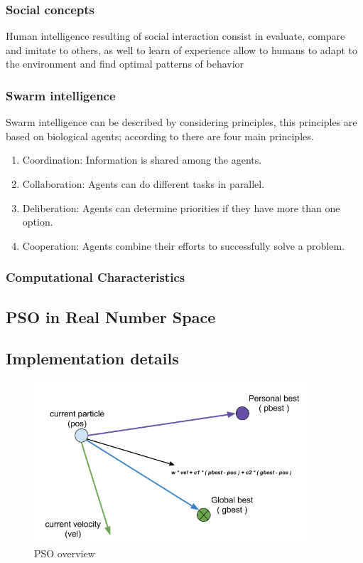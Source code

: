 \documentclass[journal]{IEEEtran}
\begin{document}
\subsubsection{ Social concepts }
Human intelligence resulting of social interaction consist in evaluate, compare and imitate to others, as well to learn of experience allow to humans to adapt to the environment and find optimal patterns of behavior

\subsubsection{ Swarm intelligence }
Swarm intelligence can be described by considering principles, this principles are based on biological agents; according to \cite{Garnier2007} there are four main principles.
\begin{enumerate}
    \item Coordination: Information is shared among the agents.
    \item Collaboration: Agents can do different tasks in parallel.
    \item Deliberation: Agents can determine priorities if they have more than one option.
    \item Cooperation: Agents combine their efforts to successfully solve a problem.
\end{enumerate}

\subsubsection{ Computational Characteristics }



\subsection{PSO in Real Number Space}


\subsection{Implementation details}

\begin{figure}
\centering
\includegraphics[width=4.0in]{_img/img_PSO_overview.png}
\caption{PSO overview}
\end{figure}
\end{document}
